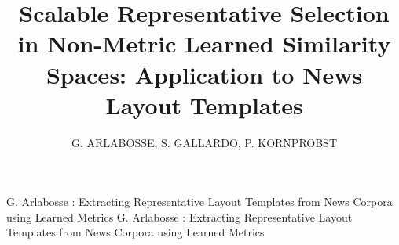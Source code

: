 \documentclass{ieeeaccess}
\begin{document}

\title{Scalable Representative Selection in Non-Metric Learned Similarity Spaces: Application to News Layout Templates}
\author{\uppercase{G. Arlabosse}, \uppercase{S. Gallardo}, \uppercase{P. Kornprobst}}

\address[1]{Centre Inria d'Université Côte d'Azur, France}
\address[2]{Demain un Autre Jour, Toulouse, France} 

\markboth
{G. Arlabosse \headeretal: Extracting Representative Layout Templates from News Corpora using Learned Metrics}
{G. Arlabosse \headeretal: Extracting Representative Layout Templates from News Corpora using Learned Metrics}

\end{document}
